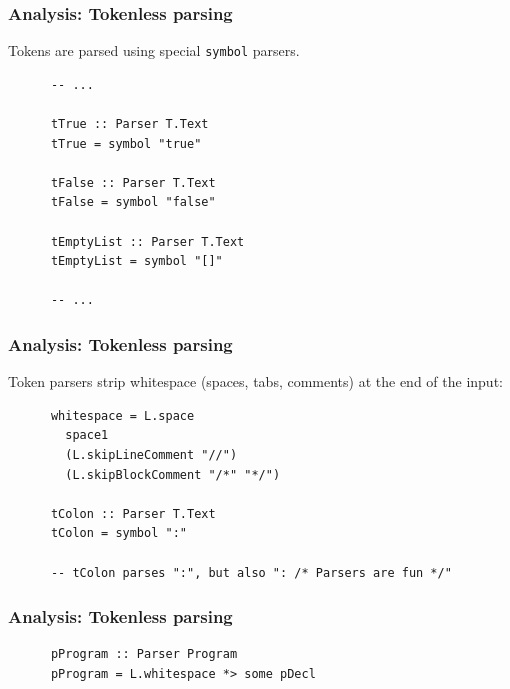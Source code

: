 \documentclass{beamer}
\begin{document}
\begin{frame}[fragile]
  \frametitle{Analysis: Tokenless parsing}

  Tokens are parsed using special \texttt{symbol} parsers.

  \begin{center}
    \begin{verbatim}
      -- ...

      tTrue :: Parser T.Text
      tTrue = symbol "true"

      tFalse :: Parser T.Text
      tFalse = symbol "false"

      tEmptyList :: Parser T.Text
      tEmptyList = symbol "[]"

      -- ...
    \end{verbatim}
  \end{center}
\end{frame}

\begin{frame}[fragile]
  \frametitle{Analysis: Tokenless parsing}

  Token parsers strip whitespace (spaces, tabs, comments) at the end of the input:

  \begin{center}
    \begin{verbatim}
      whitespace = L.space
        space1
        (L.skipLineComment "//")
        (L.skipBlockComment "/*" "*/")

      tColon :: Parser T.Text
      tColon = symbol ":"

      -- tColon parses ":", but also ": /* Parsers are fun */"
    \end{verbatim}
  \end{center}
\end{frame}

\begin{frame}[fragile]
  \frametitle{Analysis: Tokenless parsing}

  \begin{center}
    \begin{verbatim}
      pProgram :: Parser Program
      pProgram = L.whitespace *> some pDecl
    \end{verbatim}
  \end{center}
\end{frame}
\end{document}
